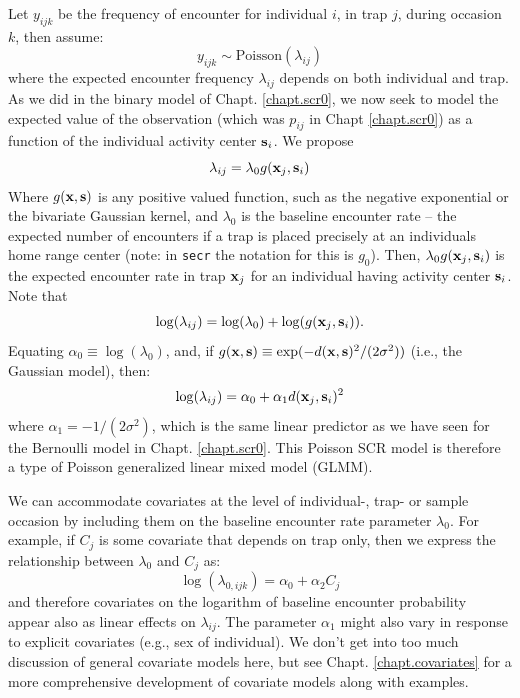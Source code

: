 Let $y_{ijk}$ be the frequency of encounter for
individual $i$, in trap $j$, during occasion $k$, then assume:
\[
 y_{ijk} \sim \mbox{Poisson}(\lambda_{ij})
\]
where the expected encounter frequency $\lambda_{ij}$ depends on both
individual and trap. As we did in the binary model of
Chapt. \ref{chapt.scr0}, we
now seek to model the expected value of the observation (which was
$p_{ij}$ in Chapt \ref{chapt.scr0}) as a function of the individual activity center
${\bf s}_{i}$.
We propose
\[
 \lambda_{ij} = \lambda_{0}  g({\bf x}_{j},{\bf s}_{i})
\]
Where $g({\bf x},{\bf s})$ is any positive valued function,
such as
the negative exponential or the bivariate Gaussian kernel, and
$\lambda_{0}$ is the baseline encounter rate -- the expected number of
encounters if a trap is placed precisely at an individuals home range
center (note: in \mbox{\tt secr} the notation for this is $g_{0}$).
Then, $\lambda_{0}g({\bf x}_{j},{\bf s}_{i})$ is the expected encounter rate in trap
${\bf x}_{j}$ %
for an individual having activity center ${\bf s}_{i}$.
Note that
\[
 \log(\lambda_{ij}) = \log(\lambda_{0}) + \log(  g({\bf x}_{j},{\bf
   s}_{i}) ).
\]
Equating $\alpha_{0} \equiv \log(\lambda_{0})$, and, if
$g({\bf x},{\bf s}) \equiv \exp(-  d({\bf x},{\bf s})^2 /(2\sigma^2))$
(i.e., the Gaussian model), then:
\begin{equation}
 \log(\lambda_{ij}) = \alpha_{0} + \alpha_{1} d({\bf x}_{j},{\bf s}_{i})^{2}
\label{poisson-mn.eq.lp}
\end{equation}
where $\alpha_{1} = -1/(2\sigma^2)$,
which is the same linear predictor as we have seen for the Bernoulli
model in Chapt. \ref{chapt.scr0}.  This Poisson SCR model is therefore
a type of Poisson generalized linear mixed model (GLMM).

We can accommodate covariates at the level of individual-, trap- or
sample occasion by including them on the baseline encounter rate
parameter $\lambda_{0}$. For example, if $C_{j}$ is some covariate
that depends on trap only, then we express the relationship between
$\lambda_{0}$ and $C_{j}$ as:
\[
\log(\lambda_{0,ijk}) = \alpha_{0} + \alpha_{2} C_{j}
\]
and therefore covariates on the logarithm of baseline encounter
probability appear also as linear effects on $\lambda_{ij}$. The
parameter $\alpha_{1}$ might also vary in response to explicit
covariates (e.g., sex of individual). We don't get into too much
discussion of general covariate models here, but see
Chapt. \ref{chapt.covariates} for a more comprehensive development of
covariate models along with examples.


